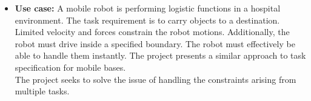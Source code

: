 \begin{itemize}
	\item \textbf{Use case:} A mobile robot is performing logistic functions in a hospital environment. The task requirement is to carry objects to a destination. Limited velocity and forces constrain the robot motions. Additionally, the robot must drive inside a specified boundary. The robot must effectively be able to handle them instantly. The project presents a similar approach to task specification for mobile bases.\\ The project seeks to solve the issue of handling the constraints arising from multiple tasks.
	
\end{itemize}

%
%
%
